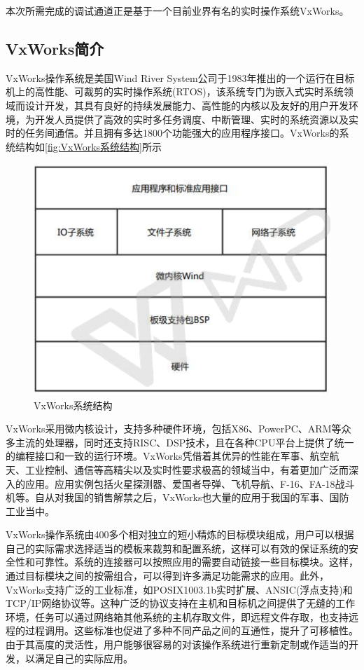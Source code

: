本次所需完成的调试通道正是基于一个目前业界有名的实时操作系统VxWorks。

\subsection{VxWorks简介}
	VxWorks操作系统是美国Wind River System公司于1983年推出的一个运行在目标机上的高性能、可裁剪的实时操作系统(RTOS)，该系统专门为嵌入式实时系统领域而设计开发，其具有良好的持续发展能力、高性能的内核以及友好的用户开发环境，为开发人员提供了高效的实时多任务调度、中断管理、实时的系统资源以及实时的任务间通信。并且拥有多达1800个功能强大的应用程序接口\cite{嵌入式实时操作系统VxWorks及其开发环境Tornado}。VxWorks的系统结构如\autoref{fig:VxWorks系统结构}所示
\begin{figure}[!h]
\centering
\includegraphics[width=.7\textwidth]{./graphics/VxWorks-sys-structure.pdf}
\caption{VxWorks系统结构}\label{fig:VxWorks系统结构}
\end{figure}
	
	VxWorks采用微内核设计，支持多种硬件环境，包括X86、PowerPC、ARM等众多主流的处理器，同时还支持RISC、DSP技术，且在各种CPU平台上提供了统一的编程接口和一致的运行环境。VxWorks凭借着其优异的性能在军事、航空航天、工业控制、通信等高精尖以及实时性要求极高的领域当中，有着更加广泛而深入的应用。应用实例包括火星探测器、爱国者导弹、飞机导航、F-16、FA-18战斗机等\cite{嵌入式实时操作系统VxWorks及其开发环境Tornado}。自从对我国的销售解禁之后，VxWorks也大量的应用于我国的军事、国防工业当中。
	
	VxWorks操作系统由400多个相对独立的短小精炼的目标模块组成，用户可以根据自己的实际需求选择适当的模板来裁剪和配置系统，这样可以有效的保证系统的安全性和可靠性。系统的连接器可以按照应用的需要自动链接一些目标模块。这样，通过目标模块之间的按需组合，可以得到许多满足功能需求的应用。此外，VxWorks支持广泛的工业标准，如POSIX1003.1b实时扩展、ANSIC(浮点支持)和TCP/IP网络协议等。这种广泛的协议支持在主机和目标机之间提供了无缝的工作环境，任务可以通过网络箱其他系统的主机存取文件，即远程文件存取，也支持远程的过程调用。这些标准也促进了多种不同产品之间的互通性，提升了可移植性。由于其高度的灵活性，用户能够很容易的对该操作系统进行重新定制或作适当的开发，以满足自己的实际应用。	
